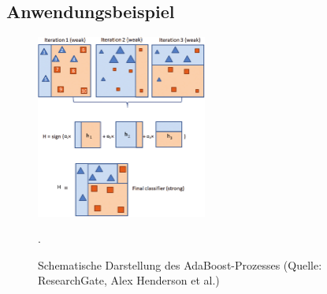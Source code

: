 \subsection{Anwendungsbeispiel}
\begin{figure} %
    \centering
    \includegraphics[width=0.5\textwidth]{Images/adaBoostSchemaatic.png}
    \caption[Schematische Darstellung des AdaBoost-Prozesses]{Schematische Darstellung des AdaBoost-Prozesses (Quelle: ResearchGate, Alex Henderson et al.)}.
    \label{fig:adaboost_schematic}
  \end{figure}

